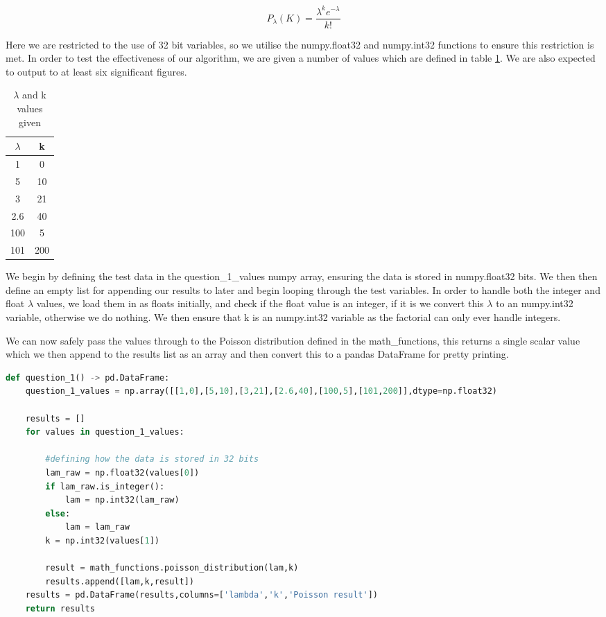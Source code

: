 \documentclass{article}
\begin{document}
\begin{equation}
    P_\lambda(K) = \frac{\lambda^ke^{-\lambda}}{k!}
    \label{eq:poisson}
\end{equation}

Here we are restricted to the use of 32 bit variables, so we utilise the numpy.float32 and numpy.int32 functions to ensure this restriction is met. In order to test the effectiveness of our algorithm, we are given a number of values which are defined in table \ref{tab:lam_and_k}. We are also expected to output to at least six significant figures.

\begin{table}[]
    \centering
    \begin{tabular}{|c|c|}
        \hline
        $\lambda$ & k \\
        \hline
        1 & 0 \\
        5 & 10 \\
        3 & 21 \\
        2.6 & 40 \\
        100 & 5 \\
        101 & 200 \\
        \hline
    \end{tabular}
    \caption{$\lambda$ and k values given}
    \label{tab:lam_and_k}
\end{table}

We begin by defining the test data in the question\_1\_values numpy array, ensuring the data is stored in numpy.float32 bits. We then then define an empty list for appending our results to later and begin looping through the test variables. In order to handle both the integer and float $\lambda$ values, we load them in as floats initially, and check if the float value is an integer, if it is we convert this $\lambda$ to an numpy.int32 variable, otherwise we do nothing. We then ensure that k is an numpy.int32 variable as the factorial can only ever handle integers.

We can now safely pass the values through to the Poisson distribution defined in the math\_functions, this returns a single scalar value which we then append to the results list as an array and then convert this to a pandas DataFrame for pretty printing.

\begin{lstlisting}[language=Python]
def question_1() -> pd.DataFrame:
    question_1_values = np.array([[1,0],[5,10],[3,21],[2.6,40],[100,5],[101,200]],dtype=np.float32)

    results = []
    for values in question_1_values:

        #defining how the data is stored in 32 bits
        lam_raw = np.float32(values[0])
        if lam_raw.is_integer():
            lam = np.int32(lam_raw)
        else:
            lam = lam_raw
        k = np.int32(values[1])

        result = math_functions.poisson_distribution(lam,k)
        results.append([lam,k,result])
    results = pd.DataFrame(results,columns=['lambda','k','Poisson result'])
    return results
\end{lstlisting}
\end{document}
